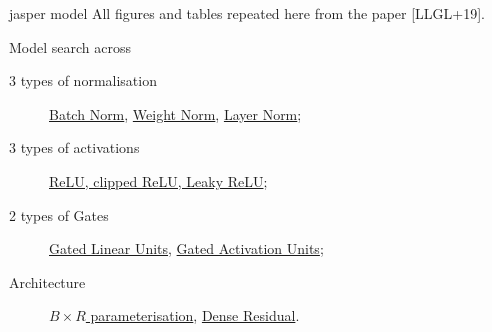 \documentclass[aspectratio=169,xcolor={dvipsnames,svgnames}]{beamer}
\begin{document}
\begin{frame}[label={sec:jasper-model}]{jasper model}
All figures and tables repeated here from the paper
[LLGL+19].

Model search across
\begin{description}
\item[{3 types of normalisation}] \hyperlink{sec:batch-norm}{Batch Norm}, \hyperlink{sec:weight-norm}{Weight Norm},
\hyperlink{sec:layer-norm}{Layer Norm};
\item[{3 types of activations}] \hyperlink{sec:org271b691}{ReLU, clipped ReLU, Leaky
ReLU};
\item[{2 types of Gates}] \hyperlink{sec:gated-linear-unit}{Gated Linear Units}, \hyperlink{sec:gated-activation-unit}{Gated
Activation Units};
\item[{Architecture}] \hyperlink{sec:jasper-b-times-r-architecture}{\(B\times R\) parameterisation}, \hyperlink{sec:jasper-dense-residual-architecture}{Dense
Residual}.
\end{description}
\end{frame}
\end{document}

